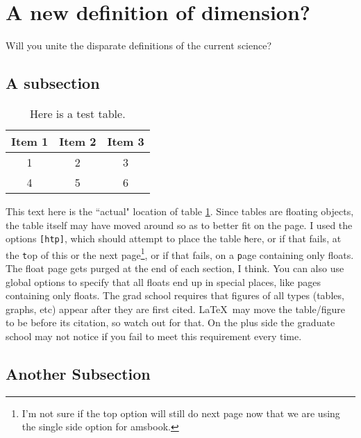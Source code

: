\documentclass{csuthesis}
\begin{document}
\section{A new definition of dimension?}

Will you unite the disparate definitions of the current science? \lipsum[1]

\subsection{A subsection}

\begin{table}[htp]
\caption[Test table]{Here is a test table.}
\label{table:faketable}
\begin{tabular}{|c|c|c|}
\hline
Item 1 & Item 2 & Item 3\\
\hline
1 & 2 & 3 \\
4 & 5 & 6 \\
\hline
\end{tabular}
\end{table}

This text here is the ``actual" location of table \ref{table:faketable}.  Since tables are floating objects, the table itself may have moved around so as to better fit on the page.  I used the options \verb-[htp]-, which should attempt to place the table \verb-h-ere, or if that fails, at the \verb-t-op of this or the next page\footnote{I'm not sure if the top option will still do next page now that we are using the single side option for amsbook.}, or if that fails, on a \verb-p-age containing only floats.  The float page gets purged at the end of each section, I think.  You can also use global options to specify that all floats end up in special places, like pages containing only floats.  The grad school requires that figures of all types (tables, graphs, etc) appear after they are first cited.  \LaTeX\ may move the table/figure to be before its citation, so watch out for that.  On the plus side the graduate school may not notice if you fail to meet this requirement every time.

\subsection{Another Subsection}
\end{document}
